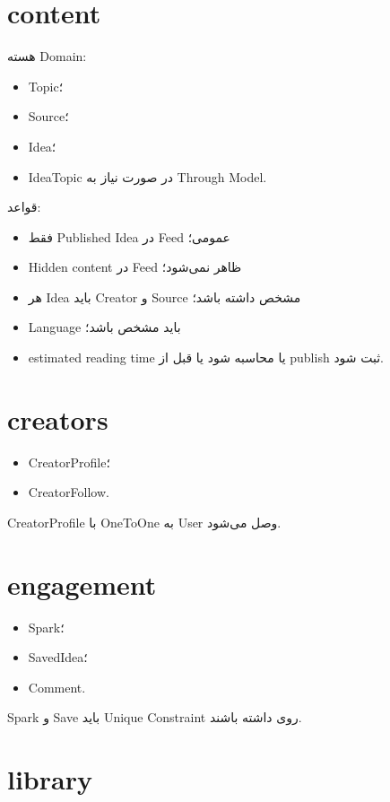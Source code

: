 \section{content}

هسته Domain:
\begin{itemize}
  \item Topic؛
  \item Source؛
  \item Idea؛
  \item IdeaTopic در صورت نیاز به Through Model.
\end{itemize}

قواعد:
\begin{itemize}
  \item فقط Published Idea در Feed عمومی؛
  \item Hidden content در Feed ظاهر نمی‌شود؛
  \item هر Idea باید Creator و Source مشخص داشته باشد؛
  \item Language باید مشخص باشد؛
  \item estimated reading time یا محاسبه شود یا قبل از publish ثبت شود.
\end{itemize}

\section{creators}

\begin{itemize}
  \item CreatorProfile؛
  \item CreatorFollow.
\end{itemize}

CreatorProfile با OneToOne به User وصل می‌شود.

\section{engagement}

\begin{itemize}
  \item Spark؛
  \item SavedIdea؛
  \item Comment.
\end{itemize}

Spark و Save باید Unique Constraint روی  داشته باشند.

\section{library}


